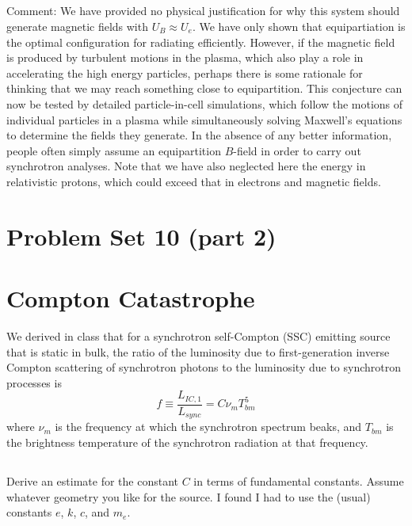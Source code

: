 \documentclass[11pt]{article}
\begin{document}
\subsection*{}

Comment: We have provided no physical justification for why this system should
generate magnetic fields with $U_B\approx U_e$. We have only shown that equipartiation
is the optimal configuration for radiating efficiently. However, if the
magnetic field is produced by turbulent motions in the plasma, which also play
a role in accelerating the high energy particles, perhaps there is some
rationale for thinking that we may reach something close to equipartition. This
conjecture can now be tested by detailed particle-in-cell simulations, which
follow the motions of individual particles in a plasma while simultaneously
solving Maxwell's equations to determine the fields they generate. In the
absence of any better information, people often simply assume an equipartition
$B$-field in order to carry out synchrotron analyses. Note that we have also
neglected here the energy in relativistic protons, which could exceed that in
electrons and magnetic fields.

\section*{Problem Set 10 (part 2)}

\section{Compton Catastrophe}

We derived in class that for a synchrotron self-Compton (SSC) emitting source
that is static in bulk, the ratio of the luminosity due to first-generation
inverse Compton scattering of synchrotron photons to the luminosity due to synchrotron processes is
\begin{equation}
f\equiv\frac{L_{IC,1}}{L_{sync}}=C\nu_mT_{bm}^5
\end{equation}
where $\nu_m$ is the frequency at which the synchrotron spectrum beaks, and $T_{bm}$
is the brightness temperature of the synchrotron radiation at that frequency.

\subsection{}
Derive an estimate for the constant $C$ in terms of fundamental constants.
Assume whatever geometry you like for the source.  I found I had to use the (usual)
constants $e$, $k$, $c$, and $m_e$.
\end{document}
